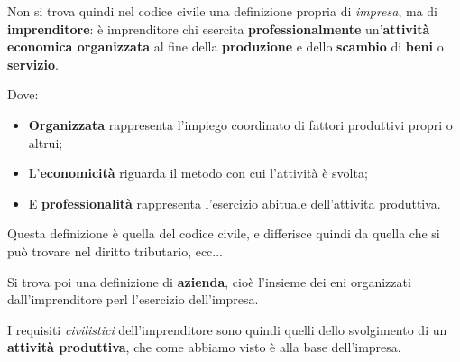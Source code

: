 \documentclass[a4paper,11pt]{article}
\begin{document}
Non si trova quindi nel codice civile una definizione propria di \textit{impresa}, ma di \textbf{imprenditore}: è imprenditore chi esercita \textbf{professionalmente} un'\textbf{attività economica organizzata} al fine della \textbf{produzione} e dello \textbf{scambio} di \textbf{beni} o \textbf{servizio}.

Dove:
\begin{itemize}
	\item \textbf{Organizzata} rappresenta l'impiego coordinato di fattori produttivi propri o altrui;
	\item L'\textbf{economicità} riguarda il metodo con cui l'attività è svolta;
	\item E \textbf{professionalità} rappresenta l'esercizio abituale dell'attivita produttiva.
\end{itemize}

Questa definizione è quella del codice civile, e differisce quindi da quella che si può trovare nel diritto tributario, ecc... 

Si trova poi una definizione di \textbf{azienda}, cioè l'insieme dei eni organizzati dall'imprenditore perl l'esercizio dell'impresa.

I requisiti \textit{civilistici} dell'imprenditore sono quindi quelli dello svolgimento di un \textbf{attività produttiva}, che come abbiamo visto è alla base dell'impresa.
\end{document}
